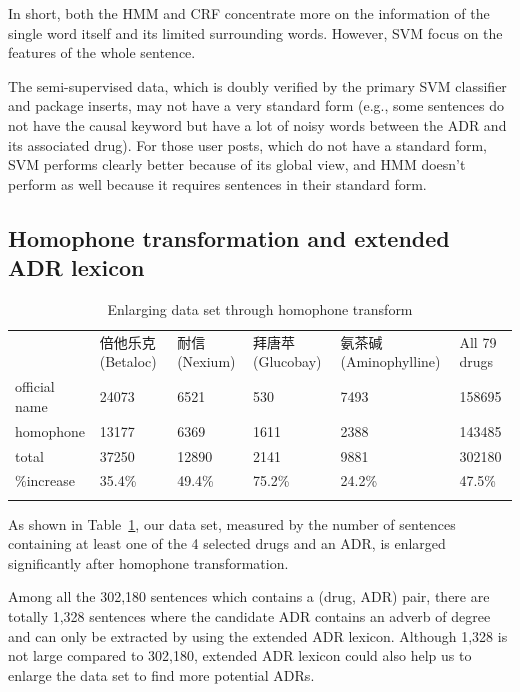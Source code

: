 In short, both the HMM and CRF concentrate more on the information of the single word itself and its limited surrounding words. However, SVM focus on the features of the whole sentence.

The semi-supervised data, which is doubly verified by the primary SVM classifier and package inserts, may not have a very standard form (e.g., some sentences do not have the causal keyword but have a lot of noisy words between the ADR and its associated drug). For those user posts, which do not have a standard form, SVM performs clearly better because of its global view, and HMM doesn’t perform as well because it requires sentences in their standard form.

\subsection{Homophone transformation and extended ADR lexicon}
\label{subsec:3.4}

\begin{table}
	\centering
	\caption{Enlarging data set through homophone transform}
	\label{tab:5}       %
	\begin{tabular}{m{2cm}m{1.2cm}m{1.2cm}m{1.2cm}m{1.2cm}m{1.2cm}}
		\hline\noalign{\smallskip}
		& 倍他乐克 (Betaloc) & 耐信 (Nexium) & 拜唐苹 (Glucobay) & 氨茶碱 (Aminophylline) & All 79 drugs \\
		\noalign{\smallskip}\hline\noalign{\smallskip}
		official name & 24073 & 6521 & 530 & 7493 & 158695 \\
		homophone & 13177 & 6369 & 1611 & 2388 & 143485 \\
		total & 37250 & 12890 & 2141 & 9881 & 302180 \\
		\%increase & 35.4\% & 49.4\% & 75.2\% & 24.2\% & 47.5\% \\ 
		\noalign{\smallskip}\hline
	\end{tabular}
\end{table}

As shown in Table~\ref{tab:5}, our data set, measured by the number of sentences containing at least one of the 4 selected drugs and an ADR, is enlarged significantly after homophone transformation.

Among all the 302,180 sentences which contains a (drug, ADR) pair, there are totally 1,328 sentences where the candidate ADR contains an adverb of degree and can only be extracted by using the extended ADR lexicon. Although 1,328 is not large compared to 302,180, extended ADR lexicon could also help us to enlarge the data set to find more potential ADRs.

